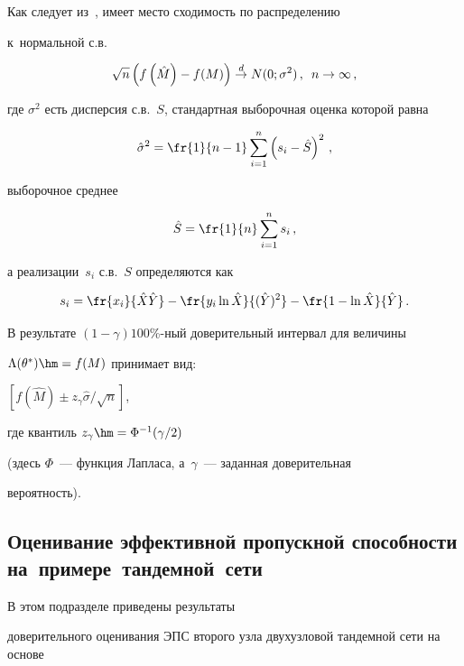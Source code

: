Как следует из~\cite{AsmussenGlynn}, имеет место  сходимость по распределению 


к~нормальной с.в.


$$ 


\sqrt{n} \left( f\left(\hat{M}\right) - f(M)\right) \stackrel{d}{\rightarrow} N(0; 


\sigma^2)\,, \enskip n \to \infty\,,


$$


где $\sigma^2$ есть дисперсия с.в.~$S$, стандартная выборочная оценка которой равна


$$


\hat{\sigma}^2 = \fr{1}{n-1} \sum\limits_{i=1}^{n} \left(s_i - \hat{S}\right)^2\,,


$$


выборочное среднее


$$


\hat{S} = \fr{1}{n} \sum\limits_{i=1}^{n} s_i\,,


$$


а реализации~$s_i$ с.в.~$S$ определяются как


$$


s_i = \fr{x_i}{\hat{X} \hat{Y}} - \fr{y_i \ln \hat{X}}{(\hat{Y})^2} - 


\fr{1-\ln \hat{X}}{\hat{Y}}\,.


$$


В результате $(1 -\gamma) 100$\%-ный до\-ве\-ри\-тель\-ный интервал для величины 


$\Lambda(\theta^*) \hm= f(M)$ принимает вид:


$\left[f\left(\hat{M}\right) \pm {z_{\gamma}\hat{\sigma}}/{\sqrt{n}}\right]$, 


где  квантиль $z_{\gamma} \hm= \Phi ^{-1} ({\gamma}/{2})$


(здесь $\Phi$~--- функция Лапласа, а~$\gamma$~--- заданная доверительная 


вероятность).





\subsection{Оценивание эффективной пропускной способности на~примере~тандемной~сети}





В этом подразделе  приведены  результаты


доверительного оценивания ЭПС второго узла двух\-уз\-ло\-вой тандемной сети на основе 


